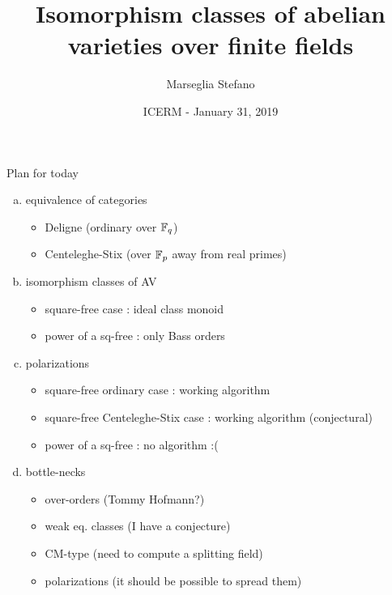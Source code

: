 \documentclass[usenames,dvipsnames]{beamer}
\title[]{Isomorphism classes of abelian varieties over finite fields}
\subtitle{}
\author[Marseglia Stefano]{Marseglia Stefano}
\institute[]{Utrecht University}
\date{ICERM - January 31, 2019}
\begin{document}
\begin{frame}
\titlepage
\end{frame}

\begin{frame}{ Plan for today }
\begin{enumerate}[(a)]
 \pause \item equivalence of categories
       \begin{itemize}
        \item Deligne (ordinary over $\mathbb{F}_q$)
        \item Centeleghe-Stix (over $\mathbb{F}_p$ away from real primes)
       \end{itemize}
 \pause \item isomorphism classes of AV
       \begin{itemize}
        \item square-free case : ideal class monoid
        \item power of a sq-free : only Bass orders
       \end{itemize}
 \pause \item polarizations
       \begin{itemize}
        \item square-free ordinary case : working algorithm
        \item square-free Centeleghe-Stix case : working algorithm (conjectural)
        \item power of a sq-free : no algorithm :(
       \end{itemize}
 \pause \item bottle-necks
       \begin{itemize}
        \item over-orders (Tommy Hofmann?)
        \item weak eq. classes (I have a conjecture)
        \item CM-type (need to compute a splitting field)
        	\item polarizations (it should be possible to spread them)
       \end{itemize}
\end{enumerate}
\end{frame}
\end{document}
